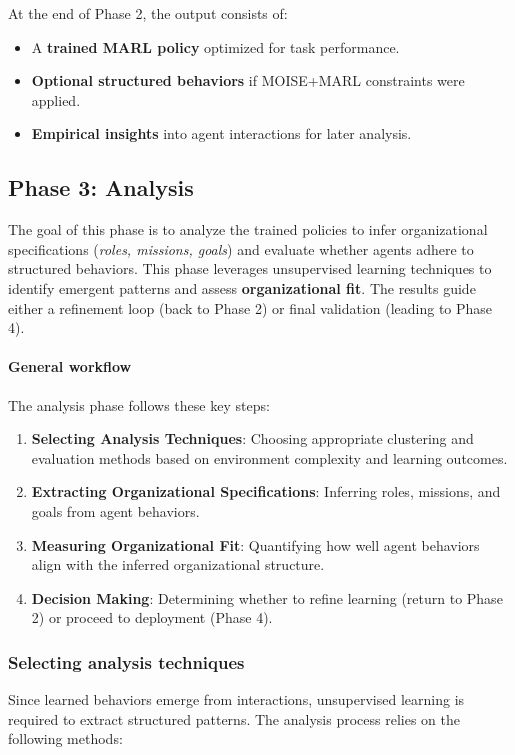 \documentclass[pdflatex,sn-mathphys-num]{sn-jnl}%
\theoremstyle{thmstyleone}%
\theoremstyle{thmstyletwo}%
\theoremstyle{thmstylethree}%
\begin{document}
At the end of Phase 2, the output consists of:
\begin{itemize}
    \item A \textbf{trained MARL policy} optimized for task performance.
    \item \textbf{Optional structured behaviors} if MOISE+MARL constraints were applied.
    \item \textbf{Empirical insights} into agent interactions for later analysis.
\end{itemize}

\subsection{Phase 3: Analysis}

The goal of this phase is to analyze the trained policies to infer organizational specifications (\textit{roles, missions, goals}) and evaluate whether agents adhere to structured behaviors. This phase leverages unsupervised learning techniques to identify emergent patterns and assess \textbf{organizational fit}. The results guide either a refinement loop (back to Phase 2) or final validation (leading to Phase 4).

\paragraph{\textbf{General workflow}} 
The analysis phase follows these key steps:
\begin{enumerate}
    \item \textbf{Selecting Analysis Techniques}: Choosing appropriate clustering and evaluation methods based on environment complexity and learning outcomes.
    \item \textbf{Extracting Organizational Specifications}: Inferring roles, missions, and goals from agent behaviors.
    \item \textbf{Measuring Organizational Fit}: Quantifying how well agent behaviors align with the inferred organizational structure.
    \item \textbf{Decision Making}: Determining whether to refine learning (return to Phase 2) or proceed to deployment (Phase 4).
\end{enumerate}

\subsubsection{Selecting analysis techniques}
Since learned behaviors emerge from interactions, unsupervised learning is required to extract structured patterns. The analysis process relies on the following methods:
\end{document}
